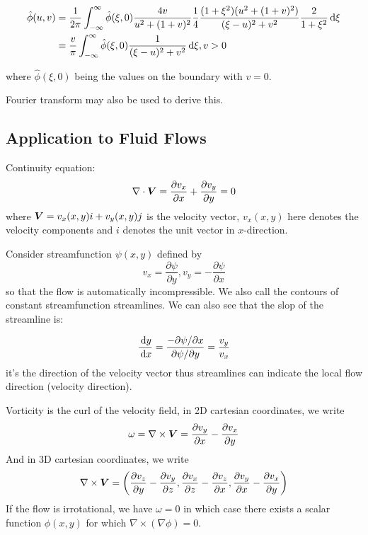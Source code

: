 \documentclass{article}
\begin{document}
\begin{align*}
    \hat\phi(u,v) &= \frac{1}{2\pi}\int_{-\infty}^\infty \hat\phi(\xi,0) \frac{4v}{u^2+(1+v)^2} \frac{1}{4}\frac{(1+\xi^2)(u^2+(1+v)^2)}{(\xi-u)^2+v^2}\frac{2}{1+\xi^2}\,\mathrm{d}\xi\\
    &= \frac{v}{\pi}\int_{-\infty}^\infty \hat\phi(\xi,0) \frac{1}{(\xi-u)^2+v^2}\,\mathrm{d}\xi, v>0
\end{align*}    

where \(\hat\phi(\xi,0)\) being the values on the boundary with \(v=0\).

\begin{remark}
    Fourier transform may also be used to derive this.
\end{remark}

\subsection{Application to Fluid Flows}

\begin{definition}
    Continuity equation:
    \[\nabla\cdot \boldsymbol{V} = \frac{\partial v_x}{\partial x}+\frac{\partial v_y}{\partial y} = 0\]
    where \(\boldsymbol{V}=v_x(x,y)i+v_y(x,y)j\) is the velocity vector, \(v_x(x,y)\) here denotes the velocity components and \(i\) denotes the unit vector in \(x\)-direction.
\end{definition}

\begin{definition}[Streamfunction]
    Consider streamfunction \(\psi(x,y)\) defined by 
    \[v_x = \frac{\partial\psi}{\partial y}, v_y = -\frac{\partial \psi}{\partial x}\]
    so that the flow is automatically incompressible. We also call the contours of constant streamfunction streamlines. We can also see that the slop of the streamline is:

    \[\frac{\,\mathrm{d} y}{\,\mathrm{d} x} = \frac{-\partial\psi/\partial x}{\partial \psi/\partial y} = \frac{v_y}{v_x}\]
    it's the direction of the velocity vector thus streamlines can indicate the local flow direction (velocity direction).
\end{definition}

\begin{definition}[vorticity]
    Vorticity is the curl of the velocity field, in 2D cartesian coordinates, we write
    \[\omega = \nabla\times \boldsymbol{V} = \frac{\partial v_y}{\partial x}-\frac{\partial v_x}{\partial y}\]
    And in 3D cartesian coordinates, we write
    \[\nabla\times\boldsymbol{V} = \left( \frac{\partial v_z}{\partial y}-\frac{\partial v_y}{\partial z}, \frac{\partial v_x}{\partial z}-\frac{\partial v_z}{\partial x}, \frac{\partial v_y}{\partial x}-\frac{\partial v_x}{\partial y} \right)\]
    If the flow is irrotational, we have \(\omega=0\) in which case there exists a scalar function \(\phi(x,y)\) for which \(\nabla\times (\nabla\phi)=0\).
\end{definition}
\end{document}
